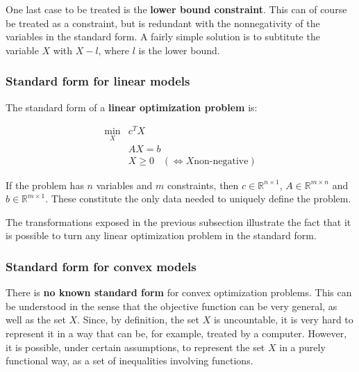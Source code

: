 One last case to be treated is the \textbf{lower bound constraint}. This can of course be treated as a constraint, but is redundant with the nonnegativity of the variables in the standard form. A fairly simple solution is to subtitute the variable $X$ with $X-l$, where $l$ is the lower bound.

\begin{center}
\end{center}


\subsubsection{Standard form for linear models}
The standard form of a \textbf{linear optimization problem} is:
\begin{framed}
$$\begin{array}{cl}
\min_X & c^T X \\
 & A X = b \\
 & X \geq 0 \;\;\; (\Longleftrightarrow X \text{non-negative})
\end{array}$$
\end{framed}

If the problem has $n$ variables and $m$ constraints, then $c \in \mathbb{R}^{n\times 1}$, $A \in \mathbb{R}^{m\times n}$ and $b \in \mathbb{R}^{m\times 1}$. These constitute the only data needed to uniquely define the problem. 

The transformations exposed in the previous subsection illustrate the fact that it is possible to turn any linear optimization problem in the standard form.

\subsubsection{Standard form for convex models}
There is \textbf{no known standard form} for convex optimization problems. This can be understood in the sense that the objective function can be very general, as well as the set $X$. Since, by definition, the set $X$ is uncountable, it is very hard to represent it in a way that can be, for example, treated by a computer. However, it is possible, under certain assumptions, to represent the set $X$ in a purely functional way, as a set of inequalities involving functions.

